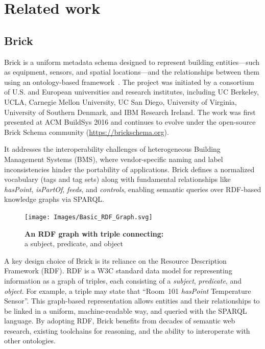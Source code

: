 \chapter{Related work}\label{chap3}

\section{Brick}
Brick is a uniform metadata schema designed to represent building
entities—such as equipment, sensors, and spatial locations—and the
relationships between them using an ontology-based framework~\cite{Balaji2016Brick}.
The project was initiated by a consortium of U.S. and European
universities and research institutes, including UC Berkeley, UCLA,
Carnegie Mellon University, UC San Diego, University of Virginia,
University of Southern Denmark, and IBM Research Ireland.
The work was first presented at ACM BuildSys 2016 and continues
to evolve under the open-source Brick Schema community
(\url{https://brickschema.org}).


It addresses the interoperability challenges of heterogeneous Building
Management Systems (BMS), where vendor-specific naming and label
inconsistencies hinder the portability of applications. Brick defines a
normalized vocabulary (tags and tag sets) along with fundamental
relationships like \emph{hasPoint}, \emph{isPartOf}, \emph{feeds}, and
\emph{controls}, enabling semantic queries over RDF-based knowledge
graphs via SPARQL.

\begin{figure}[ht!]
    \centering
    \texttt{[image: Images/Basic\_RDF\_Graph.svg]}
    \caption{\textbf{An RDF graph with triple connecting:}\\ a subject, predicate, and object}
    \label{fig:RDF}
\end{figure}

A key design choice of Brick is its reliance on the Resource
Description Framework (RDF). RDF is a W3C standard data model for
representing information as a graph of triples, each consisting of a
\emph{subject}, \emph{predicate}, and \emph{object}. For example, a
triple may state that “Room~101 \emph{hasPoint} Temperature Sensor”.
This graph-based representation allows entities and their relationships
to be linked in a uniform, machine-readable way, and queried with the
SPARQL language. By adopting RDF, Brick benefits from decades of
semantic web research, existing toolchains for reasoning, and the ability
to interoperate with other ontologies.

